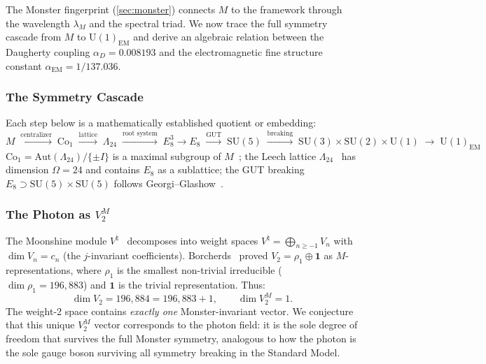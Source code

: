 \documentclass[11pt,a4paper]{article}
\theoremstyle{plain}
\theoremstyle{remark}
\renewcommand{\Omega}{\varOmega}
\begin{document}
The Monster fingerprint (\cref{sec:monster}) connects $M$ to the framework
through the wavelength $\lambda_M$ and the spectral triad.  We now trace
the full symmetry cascade from $M$ to $\mathrm{U}(1)_{\mathrm{EM}}$ and
derive an algebraic relation between the Daugherty coupling
$\alpha_D=0.008193$ and the electromagnetic fine structure constant
$\alpha_{\mathrm{EM}}=1/137.036$.

\subsubsection{The Symmetry Cascade}

Each step below is a mathematically established quotient or embedding:
\[
M \;\xrightarrow{\text{centralizer}}\; \mathrm{Co}_1
  \;\xrightarrow{\text{lattice}}\; \Lambda_{24}
  \;\xrightarrow{\text{root system}}\; E_8^3 \to E_8
  \;\xrightarrow{\text{GUT}}\; \mathrm{SU}(5)
  \;\xrightarrow{\text{breaking}}\; \mathrm{SU}(3){\times}\mathrm{SU}(2){\times}\mathrm{U}(1)
  \;\to\; \mathrm{U}(1)_{\mathrm{EM}}
\]
$\mathrm{Co}_1 = \mathrm{Aut}(\Lambda_{24})/\{\pm I\}$ is a maximal
subgroup of $M$~\cite{conway-norton1979}; the Leech lattice
$\Lambda_{24}$~\cite{conway-sloane1999} has dimension $\Omega=24$ and
contains $E_8$ as a sublattice; the GUT breaking
$E_8 \supset \mathrm{SU}(5)\times\mathrm{SU}(5)$ follows
Georgi--Glashow~\cite{georgi-glashow1974}.

\subsubsection{The Photon as $V_2^M$}

The Moonshine module $V^\natural$~\cite{frenkel-lepowsky-meurman1988}
decomposes into weight spaces
$V^\natural = \bigoplus_{n\geq -1} V_n$ with $\dim V_n = c_n$
(the $j$-invariant coefficients).  Borcherds~\cite{borcherds1992}
proved $V_2 = \rho_1 \oplus \mathbf{1}$ as $M$-representations,
where $\rho_1$ is the smallest non-trivial irreducible ($\dim\rho_1=196{,}883$)
and $\mathbf{1}$ is the trivial representation.  Thus:
\begin{equation}\label{eq:mckay}
  \dim V_2 = 196{,}884 = 196{,}883 + 1,
  \qquad \dim V_2^M = 1.
\end{equation}
The weight-2 space contains \emph{exactly one} Monster-invariant vector.
We conjecture that this unique $V_2^M$ vector corresponds to the
photon field: it is the sole degree of freedom that survives the full
Monster symmetry, analogous to how the photon is the sole gauge boson
surviving all symmetry breaking in the Standard Model.
\end{document}
